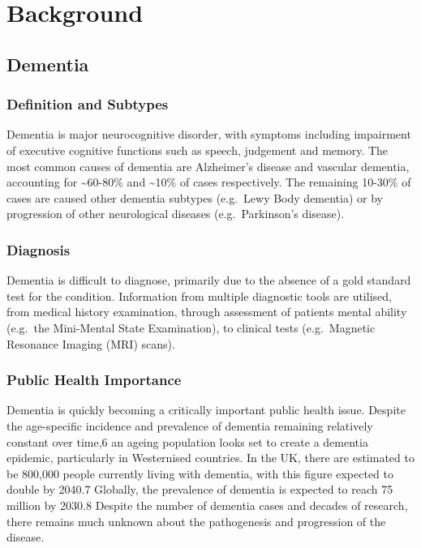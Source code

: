 \documentclass[a4paper, twoside]{templates/ociamthesis}
\begin{document}
\hypertarget{background-heading}{%
\chapter{Background}\label{background-heading}}

\minitoc 

\hypertarget{dementia}{%
\section{Dementia}\label{dementia}}

\hypertarget{definition-and-subtypes}{%
\subsection{Definition and Subtypes}\label{definition-and-subtypes}}

Dementia is major neurocognitive disorder, with symptoms including impairment of executive cognitive functions such as speech, judgement and memory. The most common causes of dementia are Alzheimer's disease and vascular dementia, accounting for \textasciitilde60-80\% and \textasciitilde10\% of cases respectively. The remaining 10-30\% of cases are caused other dementia subtypes (e.g.~Lewy Body dementia) or by progression of other neurological diseases (e.g.~Parkinson's disease).

\hypertarget{diagnosis}{%
\subsection{Diagnosis}\label{diagnosis}}

Dementia is difficult to diagnose, primarily due to the absence of a gold standard test for the condition. Information from multiple diagnostic tools are utilised, from medical history examination, through assessment of patients mental ability (e.g.~the Mini-Mental State Examination), to clinical tests (e.g.~Magnetic Resonance Imaging (MRI) scans).

\hypertarget{public-health-importance}{%
\subsection{Public Health Importance}\label{public-health-importance}}

Dementia is quickly becoming a critically important public health issue. Despite the age-specific incidence and prevalence of dementia remaining relatively constant over time,6 an ageing population looks set to create a dementia epidemic, particularly in Westernised countries. In the UK, there are estimated to be 800,000 people currently living with dementia, with this figure expected to double by 2040.7 Globally, the prevalence of dementia is expected to reach 75 million by 2030.8 Despite the number of dementia cases and decades of research, there remains much unknown about the pathogenesis and progression of the disease.
\end{document}
